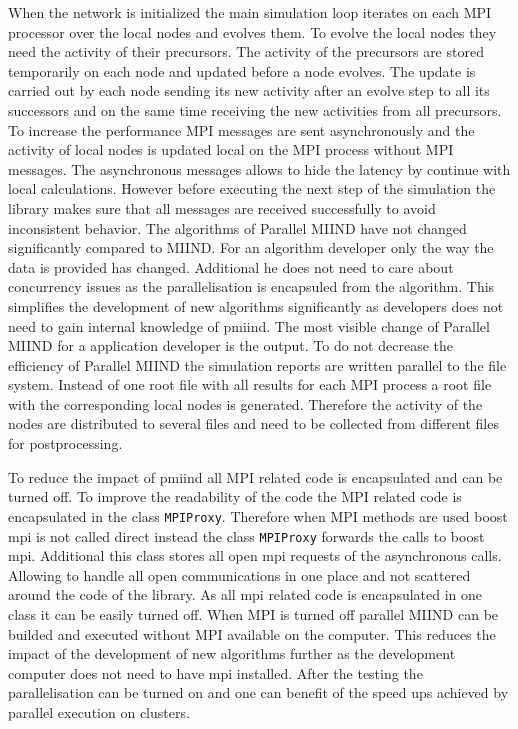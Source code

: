 \documentclass[12pt]{article}
\begin{document}
When the network is initialized the main simulation loop iterates on each MPI processor over the local nodes and evolves them.
To evolve the local nodes they need the activity of their precursors.
The activity of the precursors are stored temporarily on each node and updated before a node evolves.
The update is carried out by each node sending its new activity after an evolve step to all its successors and on the same time receiving the new activities from all precursors.
To increase the performance MPI messages are sent asynchronously and the activity of local nodes is updated local on the MPI process without MPI messages.
The asynchronous messages allows to hide the latency by continue with local calculations.
However before executing the next step of the simulation the library makes sure that all messages are received successfully to avoid inconsistent behavior.
The algorithms of Parallel MIIND have not changed significantly compared to MIIND. For an algorithm developer only the way the data is provided has changed.
Additional he does not need to care about concurrency issues as the parallelisation is encapsuled from the algorithm.
This simplifies the development of new algorithms significantly as developers does not need to gain internal knowledge of pmiind.
The most visible change of Parallel MIIND for a application developer is the output.
To do not decrease the efficiency of Parallel MIIND the simulation reports are written parallel to the file system.
Instead of one root file with all results for each MPI process a root file with the corresponding local nodes is generated.
Therefore the activity of the nodes are distributed to several files and need to be collected from different files for postprocessing.

To reduce the impact of pmiind all MPI related code is encapsulated and can be turned off.
To improve the readability of the code the MPI related code is encapsulated in the class \texttt{MPIProxy}.
Therefore when MPI methods are used boost mpi is not called direct instead the class \texttt{MPIProxy} forwards the calls to boost mpi.
Additional this class stores all open mpi requests of the asynchronous calls.
Allowing to handle all open communications in one place and not scattered around the code of the library.
As all mpi related code is encapsulated in one class it can be easily turned off.
When MPI is turned off parallel MIIND can be builded and executed without MPI available on the computer.
This reduces the impact of the development of new algorithms further as the development computer does not need to have mpi installed.
After the testing the parallelisation can be turned on and one can benefit of the speed ups achieved by parallel execution on clusters.
\end{document}
